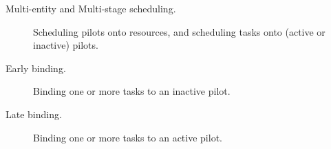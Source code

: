 \documentclass{sig-alternate}
\begin{document}
\begin{description}

\item[Multi-entity and Multi-stage scheduling.] Scheduling pilots onto
resources, and scheduling tasks onto (active or inactive) pilots.

\item[Early binding.] Binding one or more tasks to an inactive pilot.

\item[Late binding.] Binding one or more tasks to an active pilot.

\end{description}


\end{document}
